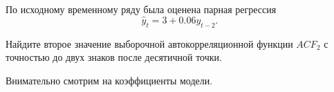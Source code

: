 
\begin{question}
По исходному временному ряду была оценена парная регрессия
\[
\hat y_t = 3 + 0.06 y_{t-2}.
\]

Найдите второе значение выборочной автокорреляционной функции \(ACF_2\) с точностью до двух знаков после десятичной точки.
\end{question}

\begin{solution}
Внимательно смотрим на коэффициенты модели.
\end{solution}

